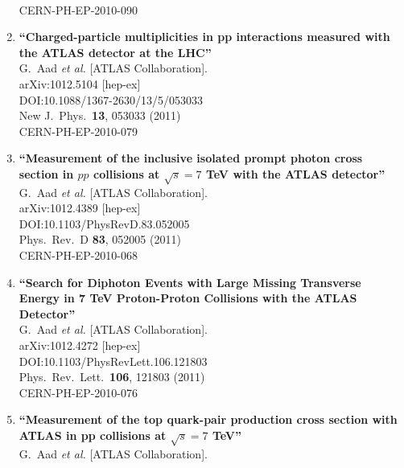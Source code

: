 \documentclass{article}
\begin{document}
\begin{enumerate}
  \\{}CERN-PH-EP-2010-090
\item%
{\bf ``Charged-particle multiplicities in pp interactions measured with the ATLAS detector at the LHC''}
  \\{}G.~Aad {\it et al.} [ATLAS Collaboration].
  \\{}arXiv:1012.5104 [hep-ex]
  \\{}DOI:10.1088/1367-2630/13/5/053033
  \\{}New J.\ Phys.\  {\bf 13}, 053033 (2011)
  \\{}CERN-PH-EP-2010-079
\item%
{\bf ``Measurement of the inclusive isolated prompt photon cross section in $pp$ collisions at $\sqrt{s}=7$ TeV with the ATLAS detector''}
  \\{}G.~Aad {\it et al.} [ATLAS Collaboration].
  \\{}arXiv:1012.4389 [hep-ex]
  \\{}DOI:10.1103/PhysRevD.83.052005
  \\{}Phys.\ Rev.\ D {\bf 83}, 052005 (2011)
  \\{}CERN-PH-EP-2010-068
\item%
{\bf ``Search for Diphoton Events with Large Missing Transverse Energy in 7 TeV Proton-Proton Collisions with the ATLAS Detector''}
  \\{}G.~Aad {\it et al.} [ATLAS Collaboration].
  \\{}arXiv:1012.4272 [hep-ex]
  \\{}DOI:10.1103/PhysRevLett.106.121803
  \\{}Phys.\ Rev.\ Lett.\  {\bf 106}, 121803 (2011)
  \\{}CERN-PH-EP-2010-076
\item%
{\bf ``Measurement of the top quark-pair production cross section with ATLAS in pp collisions at $\sqrt{s}=7$ TeV''}
  \\{}G.~Aad {\it et al.} [ATLAS Collaboration].

\end{enumerate}
\end{document}
